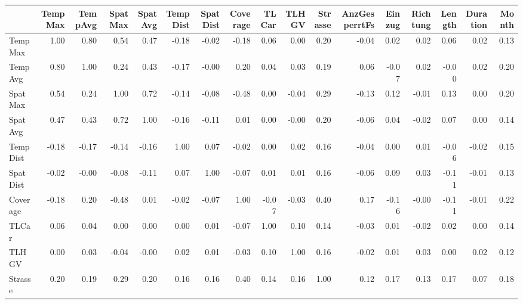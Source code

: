 \begin{tabular}{lrrrrrrrrrrrrrrrr}
\toprule
{} &  TempMax &  TempAvg &  SpatMax &  SpatAvg &  TempDist &  SpatDist &  Coverage &  TLCar &  TLHGV &  Strasse &  AnzGesperrtFs &  Einzug &  Richtung &  Length &  Duration &  Month \\
\midrule
TempMax       &     1.00 &     0.80 &     0.54 &     0.47 &     -0.18 &     -0.02 &     -0.18 &   0.06 &   0.00 &     0.20 &          -0.04 &    0.02 &      0.02 &    0.06 &      0.02 &   0.13 \\
TempAvg       &     0.80 &     1.00 &     0.24 &     0.43 &     -0.17 &     -0.00 &      0.20 &   0.04 &   0.03 &     0.19 &           0.06 &   -0.07 &      0.02 &   -0.00 &      0.02 &   0.20 \\
SpatMax       &     0.54 &     0.24 &     1.00 &     0.72 &     -0.14 &     -0.08 &     -0.48 &   0.00 &  -0.04 &     0.29 &          -0.13 &    0.12 &     -0.01 &    0.13 &      0.00 &   0.20 \\
SpatAvg       &     0.47 &     0.43 &     0.72 &     1.00 &     -0.16 &     -0.11 &      0.01 &   0.00 &  -0.00 &     0.20 &          -0.06 &    0.04 &     -0.02 &    0.07 &      0.00 &   0.14 \\
TempDist      &    -0.18 &    -0.17 &    -0.14 &    -0.16 &      1.00 &      0.07 &     -0.02 &   0.00 &   0.02 &     0.16 &          -0.04 &    0.00 &      0.01 &   -0.06 &     -0.02 &   0.15 \\
SpatDist      &    -0.02 &    -0.00 &    -0.08 &    -0.11 &      0.07 &      1.00 &     -0.07 &   0.01 &   0.01 &     0.16 &          -0.06 &    0.09 &      0.03 &   -0.11 &     -0.01 &   0.13 \\
Coverage      &    -0.18 &     0.20 &    -0.48 &     0.01 &     -0.02 &     -0.07 &      1.00 &  -0.07 &  -0.03 &     0.40 &           0.17 &   -0.16 &     -0.00 &   -0.11 &     -0.01 &   0.22 \\
TLCar         &     0.06 &     0.04 &     0.00 &     0.00 &      0.00 &      0.01 &     -0.07 &   1.00 &   0.10 &     0.14 &          -0.03 &    0.01 &     -0.02 &    0.02 &      0.00 &   0.14 \\
TLHGV         &     0.00 &     0.03 &    -0.04 &    -0.00 &      0.02 &      0.01 &     -0.03 &   0.10 &   1.00 &     0.16 &          -0.02 &    0.01 &      0.03 &    0.00 &      0.02 &   0.12 \\
Strasse       &     0.20 &     0.19 &     0.29 &     0.20 &      0.16 &      0.16 &      0.40 &   0.14 &   0.16 &     1.00 &           0.12 &    0.17 &      0.13 &    0.17 &      0.07 &   0.18 \\

\end{tabular}
